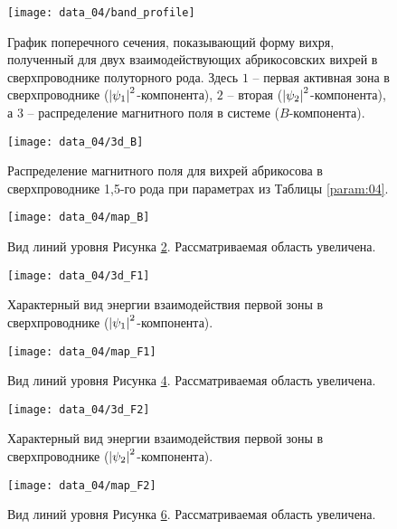 \begin{figure}[h!]
    \center
    \texttt{[image: data\_04/band\_profile]}
    \caption{График поперечного сечения, показывающий форму вихря, полученный 
        для двух взаимодействующих абрикосовских вихрей в сверхпроводнике 
        полуторного рода. Здесь \( 1 \) -- первая активная зона в 
        сверхпроводнике (\( \left| \psi_1 \right|^2 \)-компонента), \( 2 \) -- вторая 
        (\( \left| \psi_2 \right|^2 \)-компонента), а \( 3 \) -- распределение 
        магнитного поля в системе (\( B \)-компонента).}
    \label{img:band-profile-04}
\end{figure}

\begin{figure}[h!]
    \center
    \texttt{[image: data\_04/3d\_B]}
    \caption{Распределение магнитного поля для вихрей абрикосова в 
        сверхпроводнике 1,5-го рода при параметрах из Таблицы \ref{param:04}.}
    \label{img:3d-field-B-04}
\end{figure}

\begin{figure}[h!]
    \center
    \texttt{[image: data\_04/map\_B]}
    \caption{Вид линий уровня Рисунка \ref{img:3d-field-B-04}. 
        Рассматриваемая область увеличена.}
    \label{img:map-field-B-04}
\end{figure}

\begin{figure}[h!]
    \center
    \texttt{[image: data\_04/3d\_F1]}
    \caption{Характерный вид энергии взаимодействия первой зоны в 
        сверхпроводнике (\( \left| \psi_1 \right|^2 \)-компонента).}
    \label{img:3d-band-1-04}
\end{figure}

\begin{figure}[h!]
    \center
    \texttt{[image: data\_04/map\_F1]}
    \caption{Вид линий уровня Рисунка \ref{img:3d-band-1-04}. 
        Рассматриваемая область увеличена.}
    \label{img:map-band-1-04}
\end{figure}

\begin{figure}[h!]
    \center
    \texttt{[image: data\_04/3d\_F2]}
    \caption{Характерный вид энергии взаимодействия первой зоны в 
        сверхпроводнике (\( \left| \psi_2 \right|^2 \)-компонента).}
    \label{img:3d-band-2-04}
\end{figure}

\begin{figure}[h!]
    \center
    \texttt{[image: data\_04/map\_F2]}
    \caption{Вид линий уровня Рисунка \ref{img:3d-band-2-04}. 
        Рассматриваемая область увеличена.}
    \label{img:map-band-2-04}
\end{figure}

\clearpage

\newpage